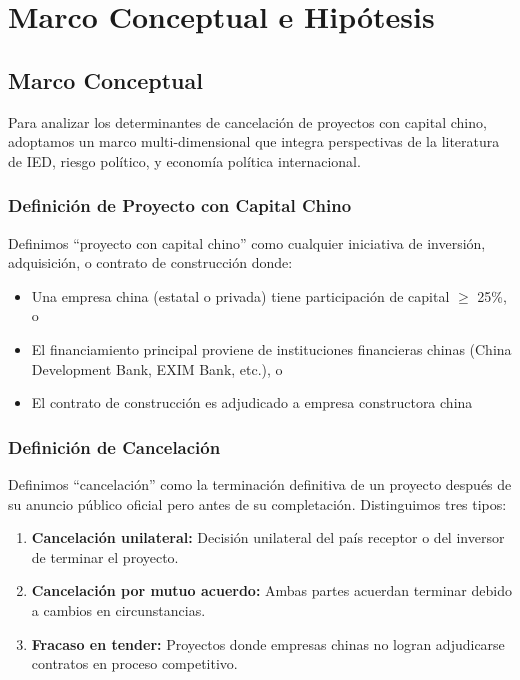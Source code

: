 \documentclass[12pt]{article}
\begin{document}
\section{Marco Conceptual e Hipótesis}

\subsection{Marco Conceptual}

Para analizar los determinantes de cancelación de proyectos con capital chino, adoptamos un marco multi-dimensional que integra perspectivas de la literatura de IED, riesgo político, y economía política internacional.

\subsubsection{Definición de Proyecto con Capital Chino}

Definimos ``proyecto con capital chino'' como cualquier iniciativa de inversión, adquisición, o contrato de construcción donde:
\begin{itemize}
    \item Una empresa china (estatal o privada) tiene participación de capital $\geq$ 25\%, o
    \item El financiamiento principal proviene de instituciones financieras chinas (China Development Bank, EXIM Bank, etc.), o
    \item El contrato de construcción es adjudicado a empresa constructora china
\end{itemize}

\subsubsection{Definición de Cancelación}

Definimos ``cancelación'' como la terminación definitiva de un proyecto después de su anuncio público oficial pero antes de su completación. Distinguimos tres tipos:

\begin{enumerate}
    \item \textbf{Cancelación unilateral:} Decisión unilateral del país receptor o del inversor de terminar el proyecto.
    \item \textbf{Cancelación por mutuo acuerdo:} Ambas partes acuerdan terminar debido a cambios en circunstancias.
    \item \textbf{Fracaso en tender:} Proyectos donde empresas chinas no logran adjudicarse contratos en proceso competitivo.
\end{enumerate}
\end{document}
